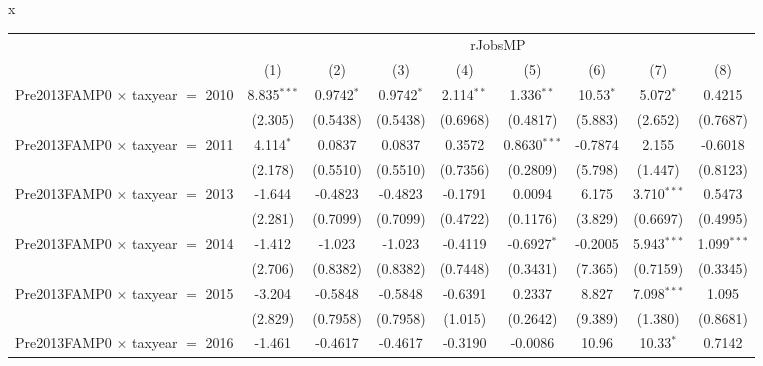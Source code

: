 x
\begingroup
\centering
\begin{tabular}{lcccccccc}
   \toprule
    & \multicolumn{8}{c}{rJobsMP}\\
                                           & (1)           & (2)           & (3)           & (4)           & (5)            & (6)           & (7)           & (8)\\  
   \midrule 
   Pre2013FAMP0 $\times$ taxyear $=$ 2010  & 8.835$^{***}$ & 0.9742$^{*}$  & 0.9742$^{*}$  & 2.114$^{**}$  & 1.336$^{**}$   & 10.53$^{*}$   & 5.072$^{*}$   & 0.4215\\   
                                           & (2.305)       & (0.5438)      & (0.5438)      & (0.6968)      & (0.4817)       & (5.883)       & (2.652)       & (0.7687)\\   
   Pre2013FAMP0 $\times$ taxyear $=$ 2011  & 4.114$^{*}$   & 0.0837        & 0.0837        & 0.3572        & 0.8630$^{***}$ & -0.7874       & 2.155         & -0.6018\\   
                                           & (2.178)       & (0.5510)      & (0.5510)      & (0.7356)      & (0.2809)       & (5.798)       & (1.447)       & (0.8123)\\   
   Pre2013FAMP0 $\times$ taxyear $=$ 2013  & -1.644        & -0.4823       & -0.4823       & -0.1791       & 0.0094         & 6.175         & 3.710$^{***}$ & 0.5473\\   
                                           & (2.281)       & (0.7099)      & (0.7099)      & (0.4722)      & (0.1176)       & (3.829)       & (0.6697)      & (0.4995)\\   
   Pre2013FAMP0 $\times$ taxyear $=$ 2014  & -1.412        & -1.023        & -1.023        & -0.4119       & -0.6927$^{*}$  & -0.2005       & 5.943$^{***}$ & 1.099$^{***}$\\   
                                           & (2.706)       & (0.8382)      & (0.8382)      & (0.7448)      & (0.3431)       & (7.365)       & (0.7159)      & (0.3345)\\   
   Pre2013FAMP0 $\times$ taxyear $=$ 2015  & -3.204        & -0.5848       & -0.5848       & -0.6391       & 0.2337         & 8.827         & 7.098$^{***}$ & 1.095\\   
                                           & (2.829)       & (0.7958)      & (0.7958)      & (1.015)       & (0.2642)       & (9.389)       & (1.380)       & (0.8681)\\   
   Pre2013FAMP0 $\times$ taxyear $=$ 2016  & -1.461        & -0.4617       & -0.4617       & -0.3190       & -0.0086        & 10.96         & 10.33$^{*}$   & 0.7142\\   

\end{tabular}
